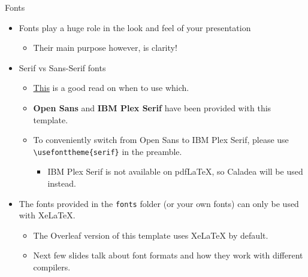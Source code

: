 \documentclass{beamer}
\newcommand{\hrefcol}[2]{\textcolor{uihteal}{\href{#1}{#2}}}
\begin{document}
\begin{frame}[fragile]{Fonts}
\begin{itemize}
\item Fonts play a huge role in the look and feel of your presentation
  \begin{itemize}
  \item Their main purpose however, is clarity!
  \end{itemize}
\item \textrm{Serif} vs \textsf{Sans-Serif} fonts
  \begin{itemize}
  \item \hrefcol{https://www.adobe.com/creativecloud/design/discover/serif-vs-sans-serif.html}{This} is a good read on when to use which.
  \item \textbf{Open Sans} and \textbf{IBM Plex Serif} have been provided with this template.
  \item To conveniently switch from Open Sans to IBM Plex Serif, please use \verb|\usefonttheme{serif}| in the preamble.
    \begin{itemize}
    \item IBM Plex Serif is not available on pdfLaTeX, so Caladea will be used instead.
    \end{itemize}
  \end{itemize}
\item The fonts provided in the \verb|fonts| folder (or your own fonts) can only be used with XeLaTeX.
    \begin{itemize}
    \item The Overleaf version of this template uses XeLaTeX by default.
    \item Next few slides talk about font formats and how they work with different compilers.
    \end{itemize}
\end{itemize}
\end{frame}
\end{document}
